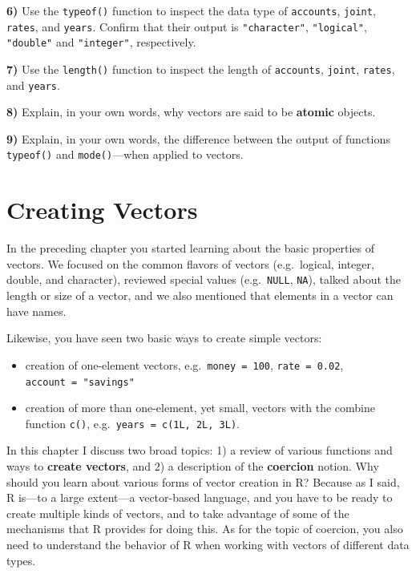 \documentclass[
]{book}
\begin{document}
\textbf{6)} Use the \texttt{typeof()} function to inspect the data type of \texttt{accounts},
\texttt{joint}, \texttt{rates}, and \texttt{years}. Confirm that their output is \texttt{"character"},
\texttt{"logical"}, \texttt{"double"} and \texttt{"integer"}, respectively.

\textbf{7)} Use the \texttt{length()} function to inspect the length of \texttt{accounts},
\texttt{joint}, \texttt{rates}, and \texttt{years}.

\textbf{8)} Explain, in your own words, why vectors are said to be \textbf{atomic} objects.

\textbf{9)} Explain, in your own words, the difference between the output of
functions \texttt{typeof()} and \texttt{mode()}---when applied to vectors.

\hypertarget{vectors3}{%
\chapter{Creating Vectors}\label{vectors3}}

In the preceding chapter you started learning about the basic properties of
vectors. We focused on the common flavors of vectors (e.g.~logical, integer,
double, and character), reviewed special values (e.g.~\texttt{NULL}, \texttt{NA}), talked
about the length or size of a vector, and we also mentioned that elements in a
vector can have names.

Likewise, you have seen two basic ways to create simple vectors:

\begin{itemize}
\item
  creation of one-element vectors, e.g.~\texttt{money\ =\ 100}, \texttt{rate\ =\ 0.02},
  \texttt{account\ =\ "savings"}
\item
  creation of more than one-element, yet small, vectors with the combine
  function \texttt{c()}, e.g.~\texttt{years\ =\ c(1L,\ 2L,\ 3L)}.
\end{itemize}

In this chapter I discuss two broad topics: 1) a review of various functions
and ways to \textbf{create vectors}, and 2) a description of the \textbf{coercion} notion.
Why should you learn about various forms of vector creation in R? Because as I
said, R is---to a large extent---a vector-based language, and you have to be
ready to create multiple kinds of vectors, and to take advantage of some of the
mechanisms that R provides for doing this. As for the topic of coercion, you
also need to understand the behavior of R when working with vectors of different
data types.
\end{document}
